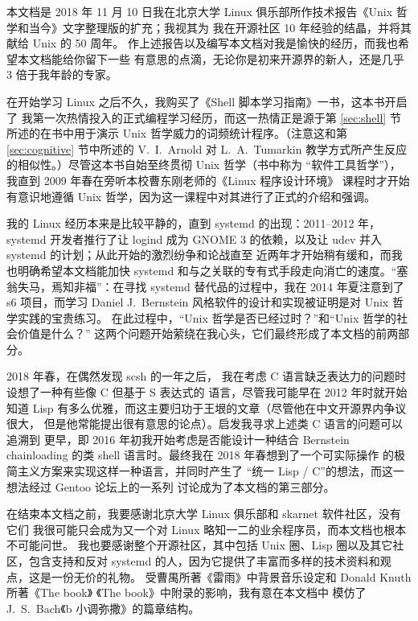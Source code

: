 \documentclass[UTF8]{ctexart}
\begin{document}
本文档是 2018 年 11 月 10 日我在北京大学 Linux 俱乐部所作技术报告《Unix
哲学和当今》\nolinebreak{}文字整理版的扩充；我视其为
我在开源社区 10 年经验的结晶，并将其献给 Unix 的 50 周年。
作上述报告以及编写本文档对我是愉快的经历，而我也希望本文档能给你留下一些
有意思的点滴，无论你是初来开源界的新人，还是几乎 3 倍于我年龄的专家。





\newpart
\printbibliography[heading = bibintoc, title = 参考资料]
\newpart
{}\label{sec:afterword}

在开始学习 Linux 之后不久，我购买了《Shell 脚本学习指南》一书，这本书开启了
我第一次热情投入的正式编程学习经历，而这一热情正是源于第 \ref{sec:shell}
节所述的在书中用于演示 Unix 哲学威力的词频统计程序。（注意这和第
\ref{sec:cognitive} 节中所述的 V.~I.\ Arnold 对 L.~A.\ Tumarkin
教学方式所产生反应的相似性。）尽管这本书自始至终贯彻 Unix 哲学（书中称为
“软件工具哲学”），我直到 2009 年春在旁听本校曹东刚老师的《Linux 程序设计环境》
课程时才开始有意识地遵循 Unix 哲学，因为这一课程中对其进行了正式的介绍和强调。

我的 Linux 经历本来是比较平静的，直到 systemd 的出现：2011--2012 年，systemd
开发者推行了让 logind 成为 GNOME 3 的依赖，以及让
udev 并入 systemd 的计划；从此开始的激烈纷争和论战直至
近两年才开始稍有缓和，而我也明确希望本文档能加快
systemd 和与之关联的专有式手段走向消亡的速度。“塞翁失马，焉知非福”：在寻找
systemd 替代品的过程中，我在 2014 年夏注意到了 s6 项目，而学习 Daniel
J.\ Bernstein 风格软件的设计和实现被证明是对 Unix 哲学实践的宝贵练习。
在此过程中，“Unix 哲学是否已经过时？”和“Unix 哲学的社会价值是什么？”
这两个问题开始萦绕在我心头，它们最终形成了本文档的前两部分。

2018 年春，在偶然发现 scsh 的一年之后，
我在考虑 C 语言缺乏表达力的问题时设想了一种有些像 C 但基于 S 表达式的
语言，尽管我可能早在 2012 年时就开始知道 Lisp
有多么优雅，而这主要归功于王垠的文章（尽管他在中文开源界内争议很大，
但是他常能提出很有意思的论点）。启发我寻求上述类 C 语言的问题可以追溯到
更早，即 2016 年初我开始考虑是否能设计一种结合 Bernstein chainloading 的类
shell 语言时。最终我在 2018 年春想到了一个可实际操作
的极简主义方案来实现这样一种语言，并同时产生了
“统一 Lisp / C”的想法，而这一想法经过 Gentoo 论坛上的一系列
讨论成为了本文档的第三部分。

在结束本文档之前，我要感谢北京大学 Linux 俱乐部和 skarnet 软件社区，没有它们
我很可能只会成为又一个对 Linux 略知一二的业余程序员，而本文档也根本不可能问世。
我也要感谢整个开源社区，其中包括 Unix 圈、Lisp 圈以及其它社区，包含支持和反对
systemd 的人，因为它提供了丰富而多样的技术资料和观点，这是一份无价的礼物。
受曹禺所著《雷雨》中背景音乐设定和 Donald Knuth 所著《The book》%
《The book》中附录的影响，我有意在本文档中
模仿了 J.~S.\ Bach《b 小调弥撒》的篇章结构。
\end{document}
